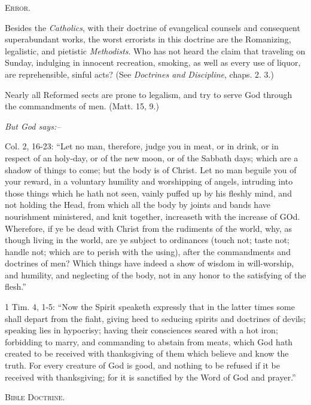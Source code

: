 \documentclass[
]{book}
\begin{document}
\begin{center}
\textsc{Error.}
\end{center}

Besides the \emph{Catholics}, with their doctrine of evangelical counsels and consequent superabundant works, the worst errorists in this doctrine are the Romanizing, legalistic, and pietistic \emph{Methodists}. Who has not heard the claim that traveling on Sunday, indulging in innocent recreation, smoking, as well as every use of liquor, are reprehensible, sinful acts? (See \emph{Doctrines and Discipline}, chaps. 2. 3.)

Nearly all Reformed sects are prone to legalism, and try to serve God through the commandments of men. (Matt. 15, 9.)

\begin{center}
\textsl{But God says:--}
\end{center}

Col. 2, 16-23: ``Let no man, therefore, judge you in meat, or in drink, or in respect of an holy-day, or of the new moon, or of the Sabbath days; which are a shadow of things to come; but the body is of Christ. Let no man beguile you of your reward, in a voluntary humility and worshipping of angels, intruding into those things which he hath not seen, vainly puffed up by his fleshly mind, and not holding the Head, from which all the body by joints and bands have nourishment ministered, and knit together, increaseth with the increase of GOd. Wherefore, if ye be dead with Christ from the rudiments of the world, why, as though living in the world, are ye subject to ordinances (touch not; taste not; handle not; which are to perish with the using), after the commandments and doctrines of men? Which things have indeed a show of wisdom in will-worship, and humility, and neglecting of the body, not in any honor to the satisfying of the flesh.''

1 Tim. 4, 1-5: ``Now the Spirit speaketh expressly that in the latter times some shall depart from the fiaht, giving heed to seducing spirits and doctrines of devils; speaking lies in hypocrisy; having their consciences seared with a hot iron; forbidding to marry, and commanding to abstain from meats, which God hath created to be received with thanksgiving of them which believe and know the truth. For every creature of God is good, and nothing to be refused if it be received with thanksgiving; for it is sanctified by the Word of God and prayer.''

\begin{center}
\textsc{Bible Doctrine.}
\end{center}
\end{document}
